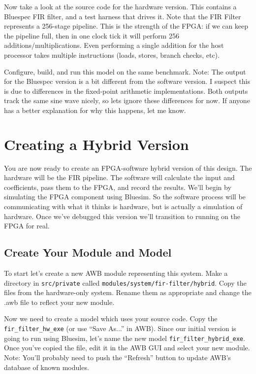 \documentclass{article}
\begin{document}
Now take a look at the source code for the hardware version. This contains a Bluespec FIR filter, and a test harness that drives it. Note that the FIR Filter
represents a 256-stage pipeline. This is the strength of the FPGA: if we can keep the pipeline full, then in one clock tick it will perform 256
additions/multiplications. Even performing a single addition for the host processor takes multiple instructions (loads, stores, branch checks, etc).

Configure, build, and run this model on the same benchmark. Note: The output for the Bluespec version is a bit different from the software version. I suspect this
is due to differences in the fixed-point arithmetic implementations. Both outputs track the same sine wave nicely, so lets ignore these differences for now. If
anyone has a better explanation for why this happens, let me know.

\section{Creating a Hybrid Version}

You are now ready to create an FPGA-software hybrid version of this design. The hardware will be the FIR pipeline. The software will
calculate the input and coefficients, pass them to the FPGA, and record the results. We'll begin by simulating the FPGA component
using Bluesim. So the software process will be communicating with what it thinks is hardware, but is actually a simulation of
hardware. Once we've debugged this version we'll transition to running on the FPGA for real.

\subsection{Create Your Module and Model}

To start let's create a new AWB module representing this system. Make a directory in \texttt{src/private} called
\texttt{modules/system/fir-filter/hybrid}. Copy the files from the hardware-only system. Rename them as appropriate and change the
.awb file to reflect your new module.

Now we need to create a model which uses your source code. Copy the \texttt{fir\_filter\_hw\_exe} (or use ``Save As...'' in AWB). Since our initial version is
going to run using Bluesim, let's name the new model \texttt{fir\_filter\_hybrid\_exe}. Once you've copied the file, edit it in the AWB GUI and select your new
module. Note: You'll probably need to push the ``Refresh'' button to update AWB's database of known modules.
\end{document}
